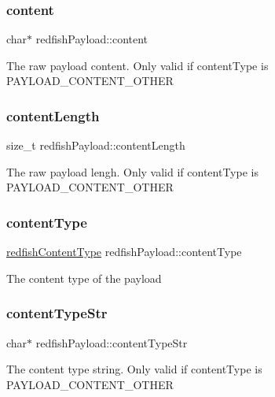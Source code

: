 \subsubsection{\texorpdfstring{content}{content}}
{\footnotesize\ttfamily char$\ast$ redfish\+Payload\+::content}

The raw payload content. Only valid if content\+Type is P\+A\+Y\+L\+O\+A\+D\+\_\+\+C\+O\+N\+T\+E\+N\+T\+\_\+\+O\+T\+H\+ER \mbox{\label{structredfishPayload_a0bced960effff58415523bd38510f793}} 
\subsubsection{\texorpdfstring{content\+Length}{contentLength}}
{\footnotesize\ttfamily size\+\_\+t redfish\+Payload\+::content\+Length}

The raw payload lengh. Only valid if content\+Type is P\+A\+Y\+L\+O\+A\+D\+\_\+\+C\+O\+N\+T\+E\+N\+T\+\_\+\+O\+T\+H\+ER \mbox{\label{structredfishPayload_a95d4e3135f102a3b50fd7f2f24ef4c20}} 
\subsubsection{\texorpdfstring{content\+Type}{contentType}}
{\footnotesize\ttfamily \hyperlink{redfishService_8h_a743ef6fcbb87f07021f20c5c0073dc34}{redfish\+Content\+Type} redfish\+Payload\+::content\+Type}

The content type of the payload \mbox{\label{structredfishPayload_abe0f2b7cd57a69505715b9711a7c6e7c}} 
\subsubsection{\texorpdfstring{content\+Type\+Str}{contentTypeStr}}
{\footnotesize\ttfamily char$\ast$ redfish\+Payload\+::content\+Type\+Str}

The content type string. Only valid if content\+Type is P\+A\+Y\+L\+O\+A\+D\+\_\+\+C\+O\+N\+T\+E\+N\+T\+\_\+\+O\+T\+H\+ER \mbox{\label{structredfishPayload_a8b13b895defa81ff8cb3948d948cea15}} 
